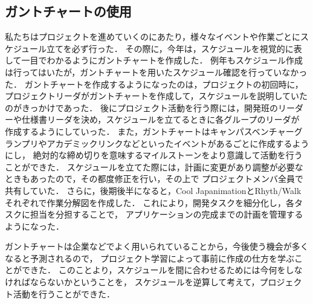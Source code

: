 \subsection{ガントチャートの使用}
\par
私たちはプロジェクトを進めていくのにあたり，様々なイベントや作業ごとにスケジュール立てを必ず行った．
その際に，今年は，スケジュールを視覚的に表して一目でわかるようにガントチャートを作成した．
例年もスケジュール作成は行ってはいたが，ガントチャートを用いたスケジュール確認を行っていなかった．
ガントチャートを作成するようになったのは，プロジェクトの初回時に，プロジェクトリーダがガントチャートを作成して，スケジュールを説明していたのがきっかけであった．
後にプロジェクト活動を行う際には，開発班のリーダーや仕様書リーダを決め，スケジュールを立てるときに各グループのリーダが
作成するようにしていった．
また，ガントチャートはキャンパスベンチャーグランプリやアカデミックリンクなどといったイベントがあるごとに作成するようにし，
絶対的な締め切りを意味するマイルストーンをより意識して活動を行うことができた．
スケジュールを立てた際には，計画に変更があり調整が必要なときもあったので，その都度修正を行い，その上で
プロジェクトメンバ全員で共有していた．
さらに，後期後半になると，Cool JapanimationとRhyth/Walkそれぞれで作業分解図を作成した．
これにより，開発タスクを細分化し，各タスクに担当を分担することで，
アプリケーションの完成までの計画を管理するようになった．
\par
ガントチャートは企業などでよく用いられていることから，今後使う機会が多くなると予測されるので，
プロジェクト学習によって事前に作成の仕方を学ぶことができた．
このことより，スケジュールを間に合わせるためには今何をしなければならないかということを，
スケジュールを逆算して考えて，プロジェクト活動を行うことができた．

